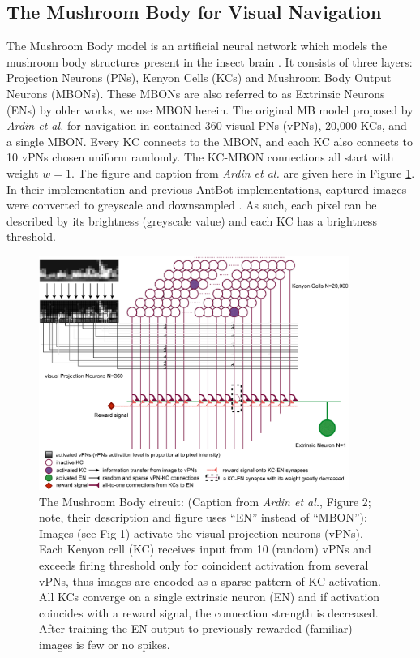 \documentclass[a4paper,11pt,twoside,openright]{article}
\begin{document}
\subsection{ The Mushroom Body for Visual Navigation } \label{MBBackground}
The Mushroom Body model is an artificial neural network which models
the mushroom body structures present in the insect brain
\cite{Ardin2016}. It consists of three layers: Projection Neurons
(PNs), Kenyon Cells (KCs) and Mushroom Body Output Neurons
(MBONs). These MBONs are also referred to as Extrinsic Neurons (ENs)
by older works, we use MBON herein. The original MB model proposed by
\textit{Ardin et al.} for navigation in \cite{Ardin2016} contained 360
visual PNs (vPNs), 20,000 KCs, and a single MBON. Every KC connects to
the MBON, and each KC also connects to 10 vPNs chosen uniform
randomly. The KC-MBON connections all start with weight $w=1$. The
figure and caption from \textit{Ardin et al.} are given here in Figure
\ref{fig:mb}. In their implementation and previous AntBot
implementations, captured images were converted to greyscale and
downsampled \cite{Ardin2016, Eberding2016, Zhang2017,
  Mitchell2018}. As such, each pixel can be described by its
brightness (greyscale value) and each KC has a brightness threshold.
\newline
\par

\begin{figure}
  \centering
  \includegraphics[width=0.9\textwidth]{Ardin2010MBModel}
  \caption{\label{fig:mb} The Mushroom Body circuit: (Caption from
    \textit{Ardin et al.}, Figure 2; note, their description and figure uses
    ``EN'' instead of ``MBON''): Images (see Fig 1) activate the visual
    projection neurons (vPNs). Each Kenyon cell (KC) receives input from 10
    (random) vPNs and exceeds firing threshold only for coincident activation
    from several vPNs, thus images are encoded as a sparse pattern of KC
    activation. All KCs converge on a single extrinsic neuron (EN) and if
    activation coincides with a reward signal, the connection strength is
    decreased. After training the EN output to previously rewarded (familiar)
    images is few or no spikes.}
\end{figure}
\end{document}
